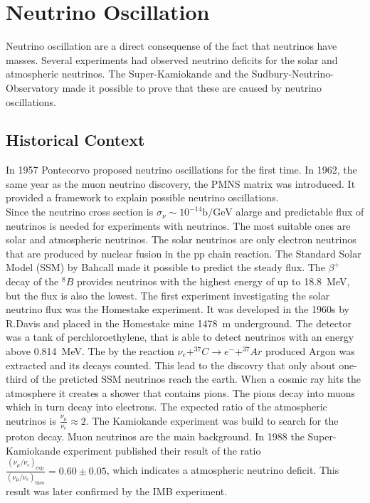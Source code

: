 \section{Neutrino Oscillation \cite{oszis}}
Neutrino oscillation are a direct consequense of the fact that neutrinos have masses. Several experiments had observed neutrino deficits for the solar and atmospheric neutrinos. The Super-Kamiokande and the Sudbury-Neutrino-Observatory made it possible to prove that these are caused by neutrino oscillations.
\subsection{Historical Context}
In 1957 Pontecorvo proposed neutrino oscillations for the first time. In 1962, the same year as the muon neutrino discovery, the PMNS matrix was introduced. It provided a framework to explain possible neutrino oscillations.\\
Since the neutrino cross section is $\sigma_{\nu} \sim 10^{-14} \si{\barn\per\giga\electronvolt}$ alarge and predictable flux of neutrinos is needed for experiments with neutrinos. The most suitable ones are solar and atmospheric neutrinos.
The solar neutrinos are only electron neutrinos that are produced by nuclear fusion in the pp chain reaction. The Standard Solar Model (SSM) by Bahcall made it possible to predict the steady flux. The $\beta^+$ decay of the $^{8}B$ provides neutrinos with the highest energy  of up to \SI{18.8}{\mega\electronvolt}, but the flux is also the lowest.
The first experiment investigating the solar neutrino flux was the Homestake experiment. It was developed in the 1960s by R.Davis and placed in the Homestake mine \SI{1478}{\meter} underground. The detector was a tank of perchloroethylene, that is able to detect neutrinos with an energy above \SI{0.814}{\mega\electronvolt}. The by the reaction $\nu_e + ^{37}C \rightarrow e^- + ^{37}Ar$ produced Argon was extracted and its decays counted. This lead to the discovry that only about one-third of the preticted SSM neutrinos reach the earth. When a cosmic ray hits the atmosphere it creates a shower that contains pions. The pions decay into muons which in turn decay into electrons. The expected ratio of the atmospheric neutrinos is $\frac{\nu_{\mu}}{\nu_e} \approx 2$. The Kamiokande experiment was build to search for the proton decay. Muon neutrinos are the main background. In 1988 the Super-Kamiokande experiment published their result of the ratio $\frac{(\nu_{\mu}/\nu_e)_\text{exp}}{(\nu_{\mu}/\nu_e)_\text{theo}} = 0.60 \pm 0.05$,
which indicates a atmospheric neutrino deficit. This result was later confirmed by the IMB experiment.

